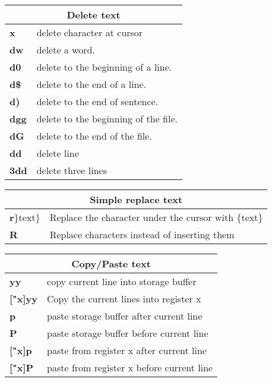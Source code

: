 \begin{table}[h]
\centering
\footnotesize
\begin{tabular}{|l|l|}
\multicolumn{2}{c}{\textbf{Delete text}}\\
\hline
\textbf{x}	& {delete character at cursor}\\
\hline
\textbf{dw}	& {delete a word.}\\
\hline
\textbf{d0}	& {delete to the beginning of a line.}\\
\hline
\textbf{d\$} & {delete to the end of a line.}\\
\hline
\textbf{d)}	& {delete to the end of sentence.}\\
\hline
\textbf{dgg} & {delete to the beginning of the file.}\\
\hline
\textbf{dG}	& {delete to the end of the file.}\\
\hline
\textbf{dd}	& {delete line}\\
\hline
\textbf{3dd} & {delete three lines}\\
\hline
\end{tabular}
\end{table}

\begin{table}[h]
\centering
\footnotesize
\begin{tabular}{|l|l|}
\multicolumn{2}{c}{\textbf{Simple replace text}}\\
\hline
{\textbf{r}$\rbrace$text$\rbrace$}	& {Replace the character under the cursor with $\lbrace$text$\rbrace$}\\
\hline
\textbf{R}	& {Replace characters instead of inserting them}\\
\hline
\end{tabular}
\end{table}

\begin{table}[h]
\centering
\footnotesize
\begin{tabular}{|l|l|}
\multicolumn{2}{c}{\textbf{Copy/Paste text}}\\
\hline
\textbf{yy}	& {copy current line into storage buffer}\\
\hline
\textbf{["x]yy}& {	Copy the current lines into register x}\\
\hline
\textbf{p}	& {paste storage buffer after current line}\\
\hline
\textbf{P}	& {paste storage buffer before current line}\\
\hline
\textbf{["x]p}	& {paste from register x after current line}\\
\hline
\textbf{["x]P}	& {paste from register x before current line}\\
\hline
\end{tabular}
\end{table}


